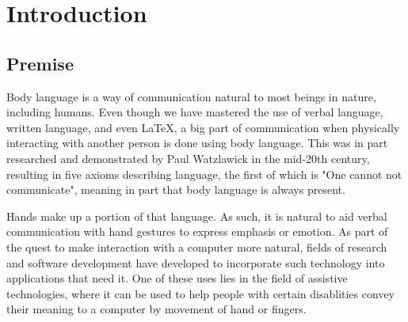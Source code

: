 \documentclass[BSA,Bachelor,english]{twbook}%
\begin{document}
{{{    \newcommand{\citefigm}[2]{(Source: taken with modification from \protect\cite{#1}, p. #2)}%
    \newcommand{\citep}{\citeasnoun}%
    \newcommand{\acessedthrough}{Available at:}%
    \newcommand{\acessedthroughp}{Available through:}%
    \newcommand{\acessedat}{Accessed}%
    \newcommand{\singlepage}{p.}%
    \newcommand{\multiplepages}{pp.}%
    \newcommand{\chapternr}{Ch.}%
    \renewcommand{\harvardand}{\&}%
    \newcommand{\abstractonly}{Abstract only}
    \newcommand{\edition}{~edition}%
}}}

\maketitle

%
%
\chapter{Introduction}

\section{Premise}

Body language is a way of communication natural to most beings in nature, including humans. Even though we have mastered the use of verbal language, written language, and even LaTeX, a big part of communication when physically interacting with another person is done using body language. This was in part researched and demonstrated by Paul Watzlawick in the mid-20th century\cite{WATZ_LIFE}, resulting in five axioms describing language, the first of which is "One cannot not communicate"\cite{WATZ_AXIOMS}, meaning in part that body language is always present.

Hands make up a portion of that language. As such, it is natural to aid verbal communication with hand gestures to express emphasis or emotion. As part of the quest to make interaction with a computer more natural, fields of research and software development have developed to incorporate such technology into applications that need it. One of these uses lies in the field of assistive technologies, where it can be used to help people with certain disablities convey their meaning to a computer by movement of hand or fingers.
\end{document}
